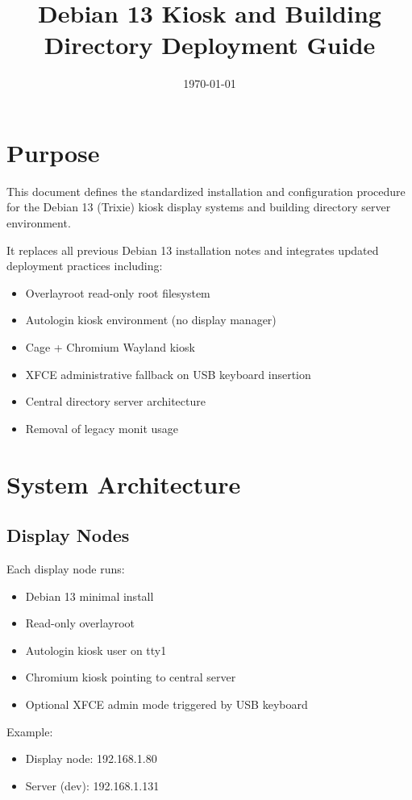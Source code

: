 \documentclass[11pt,letterpaper]{article}
\title{Debian 13 Kiosk and Building Directory Deployment Guide}
\author{}
\date{\today}
\begin{document}
\maketitle

\section*{Purpose}

This document defines the standardized installation and configuration procedure for the Debian 13 (Trixie) kiosk display systems and building directory server environment.

It replaces all previous Debian 13 installation notes and integrates updated deployment practices including:

\begin{itemize}
\item Overlayroot read-only root filesystem
\item Autologin kiosk environment (no display manager)
\item Cage + Chromium Wayland kiosk
\item XFCE administrative fallback on USB keyboard insertion
\item Central directory server architecture
\item Removal of legacy monit usage
\end{itemize}

\section{System Architecture}

\subsection{Display Nodes}

Each display node runs:

\begin{itemize}
\item Debian 13 minimal install
\item Read-only overlayroot
\item Autologin kiosk user on tty1
\item Chromium kiosk pointing to central server
\item Optional XFCE admin mode triggered by USB keyboard
\end{itemize}

Example:

\begin{itemize}
\item Display node: 192.168.1.80
\item Server (dev): 192.168.1.131
\end{itemize}
\end{document}
